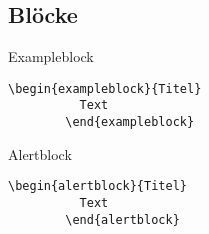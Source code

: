   \subsection{Blöcke}
  \begin{frame}[fragile]{\subsecname}

    \begin{exampleblock}{Exampleblock}
      \begin{lstlisting}[gobble=8]
        \begin{exampleblock}{Titel}
          Text
        \end{exampleblock}
      \end{lstlisting}
    \end{exampleblock}

    \begin{alertblock}{Alertblock}
      \begin{lstlisting}[gobble=8]
        \begin{alertblock}{Titel}
          Text
        \end{alertblock}
      \end{lstlisting}
    \end{alertblock}

  \end{frame}